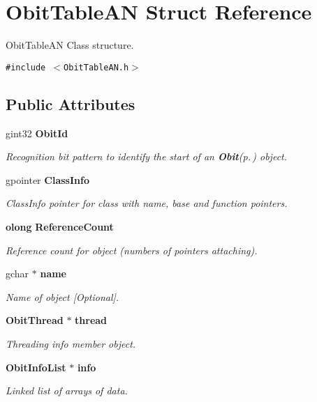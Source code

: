 \section{Obit\-Table\-AN Struct Reference}
\label{structObitTableAN}
Obit\-Table\-AN Class structure.  


{\tt \#include $<$Obit\-Table\-AN.h$>$}

\subsection*{Public Attributes}
\begin{CompactItemize}
\item 
gint32 {\bf Obit\-Id}
\begin{CompactList}\small\item\em Recognition bit pattern to identify the start of an {\bf Obit}{\rm (p.\,\pageref{structObit})} object. \item\end{CompactList}\item 
gpointer {\bf Class\-Info}
\begin{CompactList}\small\item\em Class\-Info pointer for class with name, base and function pointers. \item\end{CompactList}\item 
{\bf olong} {\bf Reference\-Count}
\begin{CompactList}\small\item\em Reference count for object (numbers of pointers attaching). \item\end{CompactList}\item 
gchar $\ast$ {\bf name}
\begin{CompactList}\small\item\em Name of object [Optional]. \item\end{CompactList}\item 
{\bf Obit\-Thread} $\ast$ {\bf thread}
\begin{CompactList}\small\item\em Threading info member object. \item\end{CompactList}\item 
{\bf Obit\-Info\-List} $\ast$ {\bf info}
\begin{CompactList}\small\item\em Linked list of arrays of data. \item\end{CompactList}\item 

\end{CompactItemize}
